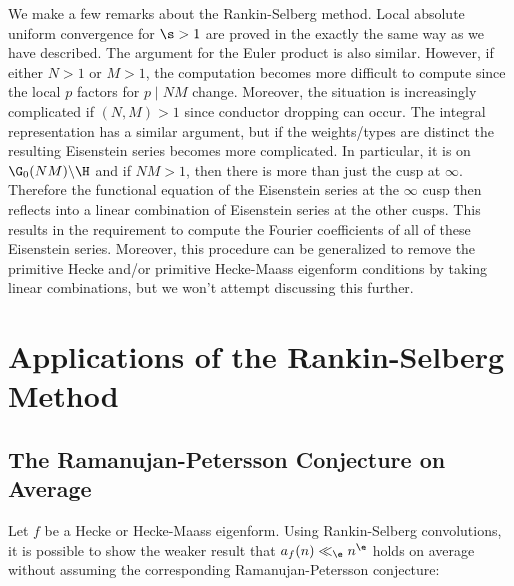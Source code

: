       We make a few remarks about the Rankin-Selberg method. Local absolute uniform convergence for $\s > 1$ are proved in the exactly the same way as we have described. The argument for the Euler product is also similar. However, if either $N > 1$ or $M > 1$, the computation becomes more difficult to compute since the local $p$ factors for $p \mid NM$ change. Moreover, the situation is increasingly complicated if $(N,M) > 1$ since conductor dropping can occur. The integral representation has a similar argument, but if the weights/types are distinct the resulting Eisenstein series becomes more complicated. In particular, it is on $\G_{0}(NM)\backslash\H$ and if $NM > 1$, then there is more than just the cusp at $\infty$. Therefore the functional equation of the Eisenstein series at the $\infty$ cusp then reflects into a linear combination of Eisenstein series at the other cusps. This results in the requirement to compute the Fourier coefficients of all of these Eisenstein series. Moreover, this procedure can be generalized to remove the primitive Hecke and/or primitive Hecke-Maass eigenform conditions by taking linear combinations, but we won't attempt discussing this further. 
  \section{Applications of the Rankin-Selberg Method}
    \subsection*{The Ramanujan-Petersson Conjecture on Average}
      Let $f$ be a Hecke or Hecke-Maass eigenform. Using Rankin-Selberg convolutions, it is possible to show the weaker result that $a_{f}(n) \ll_{\e} n^{\e}$ holds on average without assuming the corresponding Ramanujan-Petersson conjecture:
      
